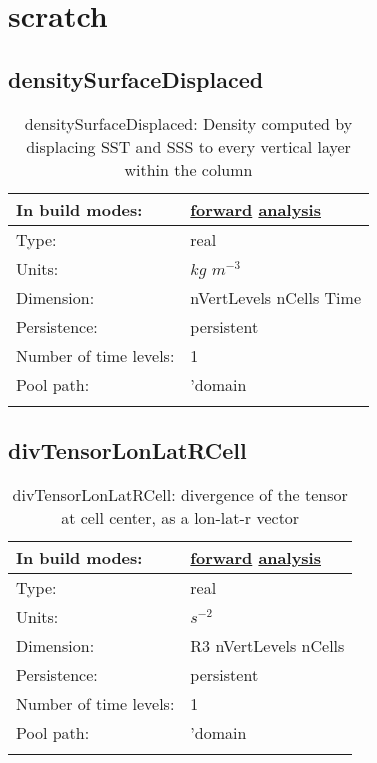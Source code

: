 \section[scratch]{scratch}
\label{sec:var_sec_scratch}
\subsection[densitySurfaceDisplaced]{densitySurfaceDisplaced}
\label{subsec:var_sec_scratch_densitySurfaceDisplaced}
\begin{center}
\begin{longtable}{| p{2.0in} | p{4.0in} |}
        \hline 
        In build modes: & \hyperref[subsec:forward_var_tab_scratch]{forward} \hyperref[subsec:analysis_var_tab_scratch]{analysis} \\
        \hline 
        Type: & real \\
        \hline 
        Units: & $kg$ $m^{-3}$ \\
        \hline 
        Dimension: & nVertLevels nCells Time \\
        \hline 
        Persistence: & persistent \\
        \hline 
        Number of time levels: & 1 \\
        \hline 
            Pool path: & 'domain %
 \\
		 \hline 
    \caption{densitySurfaceDisplaced: Density computed by displacing SST and SSS to every vertical layer within the column}
\end{longtable}
\end{center}
\subsection[divTensorLonLatRCell]{divTensorLonLatRCell}
\label{subsec:var_sec_scratch_divTensorLonLatRCell}
\begin{center}
\begin{longtable}{| p{2.0in} | p{4.0in} |}
        \hline 
        In build modes: & \hyperref[subsec:forward_var_tab_scratch]{forward} \hyperref[subsec:analysis_var_tab_scratch]{analysis} \\
        \hline 
        Type: & real \\
        \hline 
        Units: & $s^{-2}$ \\
        \hline 
        Dimension: & R3 nVertLevels nCells \\
        \hline 
        Persistence: & persistent \\
        \hline 
        Number of time levels: & 1 \\
        \hline 
            Pool path: & 'domain %
 \\
		 \hline 
    \caption{divTensorLonLatRCell: divergence of the tensor at cell center, as a lon-lat-r vector}
\end{longtable}
\end{center}
